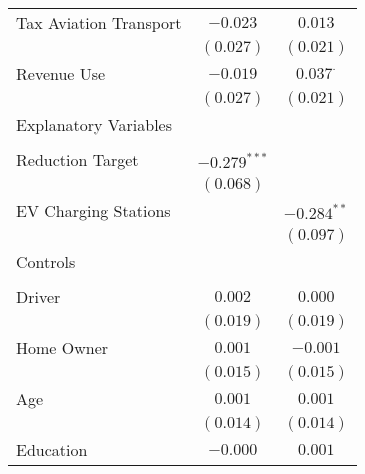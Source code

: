 \begin{center}
\begin{tiny}
\begin{longtable}{l@{} c@{} c@{}}
\quad Tax Aviation Transport                             & $-0.023$         & $0.013$          \\
                                                         & $(0.027)$        & $(0.021)$        \\
\quad Revenue Use                                        & $-0.019$         & $0.037^{\cdot}$  \\
                                                         & $(0.027)$        & $(0.021)$        \\
Explanatory Variables                                    &                  &                  \\
                                                         &                  &                  \\
\quad Reduction Target                                   & $-0.279^{***}$   &                  \\
                                                         & $(0.068)$        &                  \\
\quad EV Charging Stations                               &                  & $-0.284^{**}$    \\
                                                         &                  & $(0.097)$        \\
Controls                                                 &                  &                  \\
                                                         &                  &                  \\
\quad Driver                                             & $0.002$          & $0.000$          \\
                                                         & $(0.019)$        & $(0.019)$        \\
\quad Home Owner                                         & $0.001$          & $-0.001$         \\
                                                         & $(0.015)$        & $(0.015)$        \\
\quad Age                                                & $0.001$          & $0.001$          \\
                                                         & $(0.014)$        & $(0.014)$        \\
\quad Education                                          & $-0.000$         & $0.001$          \\

\end{longtable}
\end{tiny}
\end{center}
